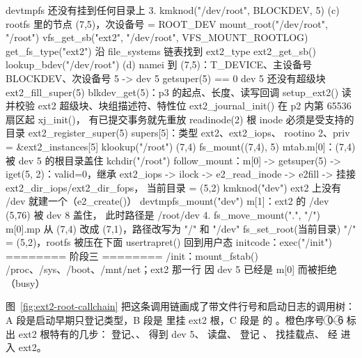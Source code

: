 \begin{txtcode}
                                       devtmpfs 还没有挂到任何目录上
    3. kmknod("/dev/root", BLOCKDEV, 5)
                                  (c)  rootfs 里的节点 (7,5)，次设备号 = ROOT_DEV
       mount_root("/dev/root", "/root")
         vfs_get_sb("ext2", "/dev/root", VFS_MOUNT_ROOTLOG)
           get_fs_type("ext2")         沿 file_systems 链表找到 ext2_type
           ext2_get_sb()
             lookup_bdev("/dev/root")
                                  (d)  namei 到 (7,5)：T_DEVICE、主设备号
                                       BLOCKDEV、次设备号 5 -> dev 5
             getsuper(5) == 0          dev 5 还没有超级块
             ext2_fill_super(5)        blkdev_get(5)：p3 的起点、长度、读写回调
               setup_ext2()            读并校验 ext2 超级块、块组描述符、特性位
               ext2_journal_init()     在 p2 内第 65536 扇区起 xj_init()，
                                       有已提交事务就先重放
               readinode(2)            根 inode 必须是受支持的目录
               ext2_register_super(5)  supers[5]：类型 ext2、ext2_iops、
                                       rootino 2、priv = &ext2_instances[5]
         klookup("/root")              (7,4)
         fs_mount((7,4), 5)            mtab.m[0]：(7,4) 被 dev 5 的根目录盖住
       kchdir("/root")                 follow_mount：m[0] -> getsuper(5)
                                       -> iget(5, 2)：valid=0，继承 ext2_iops
                                       -> ilock -> e2_read_inode -> e2fill
                                       -> 挂接 ext2_dir_iops/ext2_dir_fops，
                                          当前目录 = (5,2)
       kmknod("dev")                   ext2 上没有 /dev 就建一个（e2_create()）
       devtmpfs_mount("dev")           m[1]：ext2 的 /dev (5,76) 被 dev 8 盖住，
                                       此时路径是 /root/dev
    4. fs_move_mount(".", "/")         m[0].mp 从 (7,4) 改成 (7,1)，路径改写为
                                       "/" 和 "/dev"
       fs_set_root(当前目录)           "/" = (5,2)，rootfs 被压在下面
  usertrapret()                        回到用户态
initcode：exec("/init")                ======== 阶段三 ========
  /init：mount_fstab()                 /proc、/sys、/boot、/mnt/net；ext2 那一行
                                       因 dev 5 已经是 m[0] 而被拒绝（busy）
\end{txtcode}

图~\ref{fig:ext2-root-callchain} 把这条调用链画成了带文件行号和启动日志的调用树：A 段是启动早期只登记类型，B 段是  里挂 ext2 根，C 段是  的 。橙色序号 \textcircled{\small 0}--\textcircled{\small 6} 标出 ext2 根特有的几步： 登记、、 得到 dev 5、 读盘、 登记 、 找挂载点、 经  进入 ext2。

